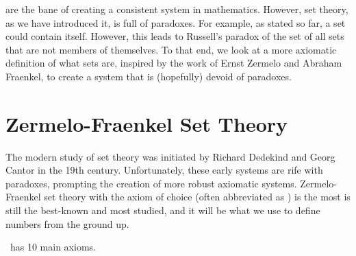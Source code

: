  are the bane of creating a consistent system in mathematics. However, set theory, as we have introduced it, is full of paradoxes. For example, as stated so far, a set could contain itself. However, this leads to Russell's paradox of the set of all sets that are not members of themselves. To that end, we look at a more axiomatic definition of what sets are, inspired by the work of Ernst Zermelo and Abraham Fraenkel, to create a system that is (hopefully) devoid of paradoxes.

\section{Zermelo-Fraenkel Set Theory}
The modern study of set theory was initiated by Richard Dedekind and Georg Cantor in the 19th century. Unfortunately, these early systems are rife with paradoxes, prompting the creation of more robust axiomatic systems. Zermelo-Fraenkel set theory with the axiom of choice (often abbreviated as \ZFC{}) is the most is still the best-known and most studied, and it will be what we use to define numbers from the ground up.

\ZFC~has 10 main axioms.

